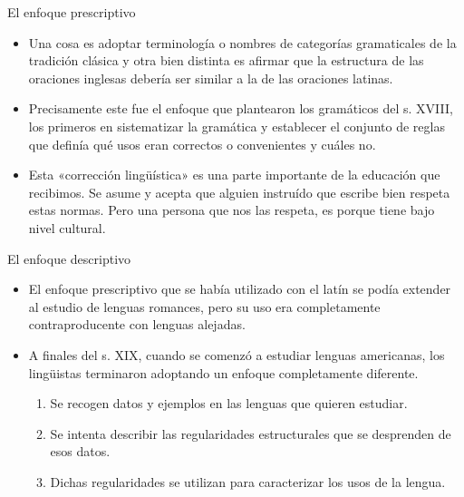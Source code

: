 \documentclass{beamer}
\begin{document}
\begin{frame}{El enfoque prescriptivo}

\begin{itemize}
    \item Una cosa es adoptar terminología o nombres de categorías gramaticales de la tradición clásica y otra bien distinta es afirmar que la estructura de las oraciones inglesas debería ser similar a la de las oraciones latinas.
    \item Precisamente este fue el enfoque que plantearon los gramáticos del s. XVIII, los primeros en sistematizar la gramática y establecer el conjunto de reglas que definía qué usos eran correctos o convenientes y cuáles no.
    \item Esta «corrección lingüística» es una parte importante de la educación que recibimos. Se asume y acepta que alguien instruído que escribe bien respeta estas normas. Pero una persona que nos las respeta, es porque tiene bajo nivel cultural.
\end{itemize}

\end{frame}

\begin{frame}{El enfoque descriptivo}

\begin{itemize}
	\item El enfoque prescriptivo que se había utilizado con el latín se podía extender al estudio de lenguas romances, pero su uso era completamente contraproducente con lenguas alejadas.
	\item A finales del s. XIX, cuando se comenzó a estudiar lenguas americanas, los lingüistas terminaron adoptando un enfoque completamente diferente.
	\begin{enumerate}
		\item Se recogen datos y ejemplos en las lenguas que quieren estudiar.
		\item Se intenta describir las regularidades estructurales que se desprenden de esos datos.
		\item Dichas regularidades se utilizan para caracterizar los usos de la lengua.
	\end{enumerate}
\end{itemize}

\end{frame}
\end{document}

